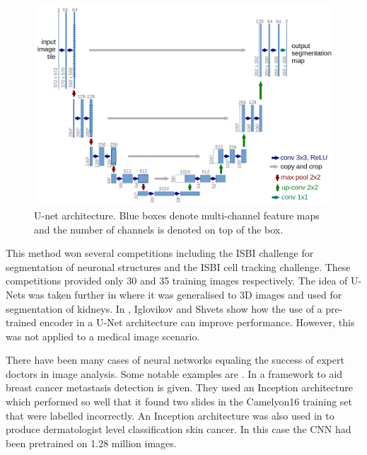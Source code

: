 \begin{figure}[hbtp!]
    \centering
    \includegraphics[width=\textwidth]{./img/u-net-architecture.png}
    \caption{U-net architecture. Blue boxes denote multi-channel feature maps and the number of channels is denoted on top of the box. \cite{Ronneberger_Fischer_Brox_2015}}
    \label{fig:unet}
\end{figure}

This method won several competitions including the ISBI challenge for segmentation of neuronal structures and the ISBI cell tracking challenge.
These competitions provided only 30 and 35 training images respectively.
The idea of U-Nets was taken further in \cite{Cicek_Abdulkadir_Lienkamp_Brox_Ronneberger_2016} where it was generalised to 3D images and used for segmentation of kidneys.
In \cite{Iglovikov_Shvets_2018}, Iglovikov and Shvets show how the use of a pre-trained encoder in a U-Net architecture can improve performance.
However, this was not applied to a medical image scenario.

There have been many cases of neural networks equaling the success of expert doctors in image analysis.
Some notable examples are \cite{Liu_Gadepalli_Norouzi_Dahl_Kohlberger_Boyko_Venugopalan_Timofeev_Nelson_Corrado_et_al_2017, Esteva_Kuprel_Novoa_Ko_Swetter_Blau_Thrun_2017}.
In \cite{Liu_Gadepalli_Norouzi_Dahl_Kohlberger_Boyko_Venugopalan_Timofeev_Nelson_Corrado_et_al_2017} a framework to aid breast cancer metastasis detection is given.
They used an Inception architecture \cite{Russakovsky_Deng_Su_Krause_Satheesh_Ma_Huang_Karpathy_Khosla_Bernstein_et_al_2015} which performed so well that it found two slides in the Camelyon16 \cite{Camelyon16} training set that were labelled incorrectly.
An Inception architecture was also used in  \cite{Esteva_Kuprel_Novoa_Ko_Swetter_Blau_Thrun_2017} to produce dermatologist level classification skin cancer.
In this case the CNN had been pretrained on 1.28 million images.


